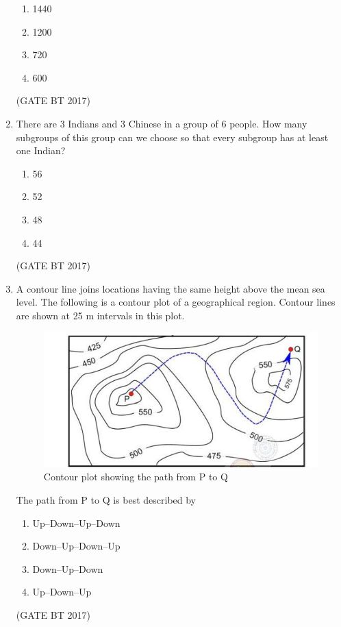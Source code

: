 \documentclass[journal,12pt,onecolumn]{IEEEtran}
\theoremstyle{remark}
\begin{document}
\begin{enumerate}
\begin{enumerate}
  \item 1440
  \item 1200
  \item 720
  \item 600
\end{enumerate}
\hfill (GATE BT 2017)

\item There are $3$ Indians and $3$ Chinese in a group of $6$ people. How many subgroups of this group can we choose so that every subgroup has at least one Indian?

\begin{enumerate}
  \item 56
  \item 52
  \item 48
  \item 44
\end{enumerate}
\hfill (GATE BT 2017)

\item A contour line joins locations having the same height above the mean sea level. The following is a contour plot of a geographical region. Contour lines are shown at 25 m intervals in this plot.

\begin{figure}
\centering
\includegraphics[width=0.8\columnwidth]{figs/contourplot.png}
\caption{Contour plot showing the path from P to Q}
\label{fig:contour_path}
\end{figure}

The path from P to Q is best described by
\begin{enumerate}
  \item Up--Down--Up--Down
  \item Down--Up--Down--Up
  \item Down--Up--Down
  \item Up--Down--Up
\end{enumerate}
\hfill (GATE BT 2017)
\end{enumerate}
\end{document}
